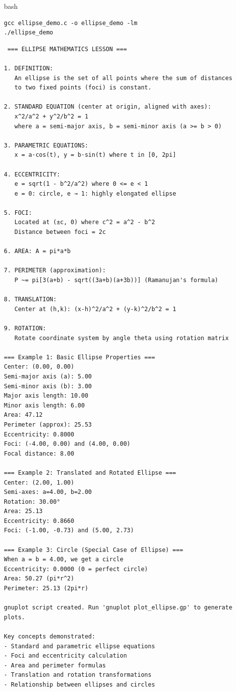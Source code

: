 \documentclass[a4paper,14pt]{article}
\begin{document}
bash\\
\begin{verbatim}
gcc ellipse_demo.c -o ellipse_demo -lm
./ellipse_demo
\end{verbatim}
\clearpage
\begin{verbatim}
 === ELLIPSE MATHEMATICS LESSON ===

1. DEFINITION:
   An ellipse is the set of all points where the sum of distances
   to two fixed points (foci) is constant.

2. STANDARD EQUATION (center at origin, aligned with axes):
   x^2/a^2 + y^2/b^2 = 1
   where a = semi-major axis, b = semi-minor axis (a >= b > 0)

3. PARAMETRIC EQUATIONS:
   x = a·cos(t), y = b·sin(t) where t in [0, 2pi]

4. ECCENTRICITY:
   e = sqrt(1 - b^2/a^2) where 0 <= e < 1
   e = 0: circle, e → 1: highly elongated ellipse

5. FOCI:
   Located at (±c, 0) where c^2 = a^2 - b^2
   Distance between foci = 2c

6. AREA: A = pi*a*b

7. PERIMETER (approximation):
   P ~= pi[3(a+b) - sqrt((3a+b)(a+3b))] (Ramanujan's formula)

8. TRANSLATION:
   Center at (h,k): (x-h)^2/a^2 + (y-k)^2/b^2 = 1

9. ROTATION:
   Rotate coordinate system by angle theta using rotation matrix

=== Example 1: Basic Ellipse Properties ===
Center: (0.00, 0.00)
Semi-major axis (a): 5.00
Semi-minor axis (b): 3.00
Major axis length: 10.00
Minor axis length: 6.00
Area: 47.12
Perimeter (approx): 25.53
Eccentricity: 0.8000
Foci: (-4.00, 0.00) and (4.00, 0.00)
Focal distance: 8.00

=== Example 2: Translated and Rotated Ellipse ===
Center: (2.00, 1.00)
Semi-axes: a=4.00, b=2.00
Rotation: 30.00°
Area: 25.13
Eccentricity: 0.8660
Foci: (-1.00, -0.73) and (5.00, 2.73)

=== Example 3: Circle (Special Case of Ellipse) ===
When a = b = 4.00, we get a circle
Eccentricity: 0.0000 (0 = perfect circle)
Area: 50.27 (pi*r^2)
Perimeter: 25.13 (2pi*r)

gnuplot script created. Run 'gnuplot plot_ellipse.gp' to generate plots.

Key concepts demonstrated:
- Standard and parametric ellipse equations
- Foci and eccentricity calculation
- Area and perimeter formulas
- Translation and rotation transformations
- Relationship between ellipses and circles
\end{verbatim}
\end{document}
